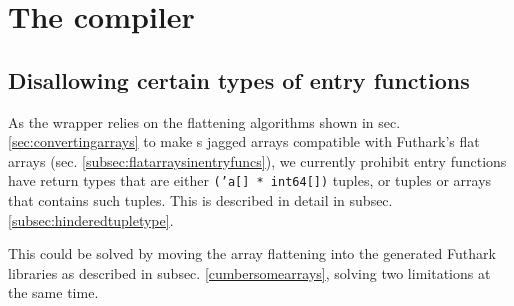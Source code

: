 \section{The \fshark{} compiler}

\subsection{Disallowing certain types of \fshark{} entry functions}
As the \fshark{} wrapper relies on the flattening algorithms shown in sec.
\ref{sec:convertingarrays} to make \fsharp{}s jagged arrays compatible with
Futhark's flat arrays (sec. \ref{subsec:flatarraysinentryfuncs}), we currently
prohibit \fshark{} entry functions have return types that are either
\texttt{('a[] * int64[])} tuples, or tuples or arrays that contains such
tuples. This is described in detail in subsec. \ref{subsec:hinderedtupletype}.

This could be solved by moving the array flattening into the generated Futhark
\csharp{} libraries as described in subsec. \ref{cumbersomearrays}, solving two
limitations at the same time.


